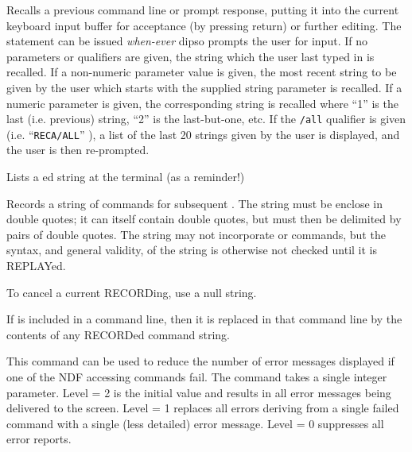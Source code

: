 \begin {description}
Recalls a previous command line or prompt response, putting it into the
current keyboard input buffer for acceptance (by pressing return) or
further editing. The   statement can be issued {\em when-ever} dipso
prompts the user for input. If no parameters or qualifiers are given, the
string which the user last typed in is recalled. If a non-numeric
parameter value is given, the most recent string to be given by the user
which starts with the supplied string parameter is recalled. If a numeric
parameter is given, the corresponding string is recalled where ``1'' is
the last (i.e. previous) string, ``2'' is the last-but-one, etc. If the
{\tt{/all}}  qualifier is given (i.e. ``{\tt{RECA/ALL}}''  ), a list of the
last 20 strings given by the user is displayed, and the user is then
re-prompted.

Lists a ed string at the terminal (as a 
reminder!)

Records a string of commands for subsequent .  The string must be
enclose in double quotes; it can itself contain double quotes, but
must then be delimited by pairs of double quotes. The string may not
incorporate   or   commands, but the syntax, and general
validity, of the string is otherwise not checked until it is REPLAYed.

To cancel a current RECORDing, use a null string.

If   is included in a command line, then it is replaced in that
command line by the contents of any RECORDed command string.

This command can be used to reduce the number of error messages displayed if one
of the NDF accessing commands fail. The command takes a single integer
parameter. Level = 2 is the initial value and results in all error messages
being delivered to the screen. Level = 1 replaces all errors deriving from a
single failed command with a single (less detailed) error message. Level = 0
suppresses all error reports.


\end{description}
